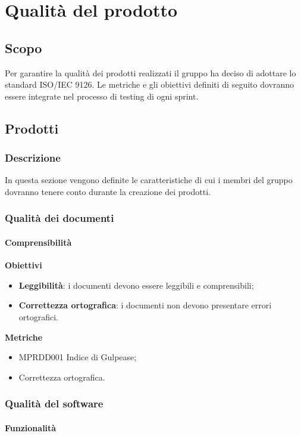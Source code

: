 \section{Qualità del prodotto}
\subsection{Scopo}
Per garantire la qualità dei prodotti realizzati il gruppo ha deciso di adottare lo standard ISO/IEC 9126.
Le metriche e gli obiettivi definiti di seguito dovranno essere integrate nel processo di testing di ogni sprint.
\subsection{Prodotti}
\subsubsection{Descrizione}
In questa sezione vengono definite le caratteristiche di cui i membri del gruppo dovranno tenere conto durante la creazione dei prodotti.
\subsubsection{Qualità dei documenti}

\paragraph{Comprensibilità}

\textbf{Obiettivi}
\begin{itemize}
\item \textbf{Leggibilità}: i documenti devono essere leggibili e comprensibili;
\item \textbf{Correttezza ortografica}: i documenti non devono presentare errori ortografici.
\end{itemize}

\textbf{Metriche}
\begin{itemize}
\item MPRDD001 Indice di Gulpease;
\item Correttezza ortografica.
\end{itemize}

\subsubsection{Qualità del software}

\paragraph{Funzionalità}

